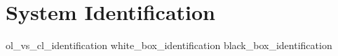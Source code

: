 \chapter{System Identification}

{ol_vs_cl_identification}
{white_box_identification}
{black_box_identification}